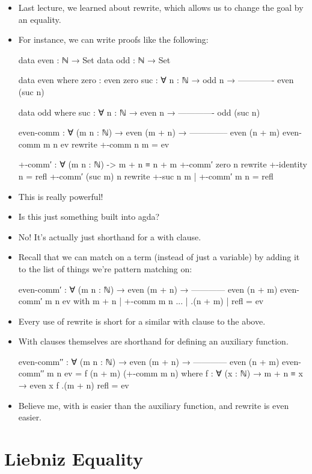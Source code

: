 \documentclass{lecturenotes}
\begin{document}
\begin{itemize}
\item Last lecture, we learned about \textsf{rewrite}, which allows us to change the goal by an equality.
\item For instance, we can write proofs like the following:
\begin{code}
data even : ℕ → Set
data odd : ℕ → Set

data even where
  zero : even zero
  suc : ∀ {n : ℕ} →
        odd n →
    -------------
    even (suc n)

data odd where
  suc : ∀ {n : ℕ} →
     even n →
  -------------
   odd (suc n)


even-comm : ∀ (m n : ℕ) →
  even (m + n) →
  --------------
  even (n + m)
even-comm m n ev rewrite +-comm n m = ev 

+-comm′ : ∀ (m n : ℕ) -> m + n ≡ n + m
+-comm′ zero n rewrite +-identity n = refl
+-comm′ (suc m) n rewrite +-suc n m | +-comm′ m n = refl    
\end{code}
\item This is really powerful! 
\item Is this just something built into agda?
\item No! It's actually just shorthand for a \textsf{with} clause.
\item Recall that we can match on a term (instead of just a variable) by adding it to the list of things we're pattern matching on:
\begin{code}
even-comm′ : ∀ (m n : ℕ) →
  even (m + n) →
  ------------
  even (n + m)
even-comm′ m n ev with   m + n  | +-comm m n
...                  | .(n + m) |       refl = ev
\end{code}
\item Every use of rewrite is short for a similar \textsf{with} clause to the above.
\item \textsf{With} clauses themselves are shorthand for defining an auxiliary function.
\begin{code}
even-comm′′ :  ∀ (m n : ℕ) →
  even (m + n) →
  ------------
  even (n + m)
even-comm′′ m n ev = f (n + m) (+-comm m n)
  where
    f : ∀ (x : ℕ) → m + n ≡ x → even x
    f .(m + n) refl = ev
\end{code}
\item Believe me, \textsf{with} is easier than the auxiliary function, and \textsf{rewrite} is even easier.
\end{itemize}

\section{Liebniz Equality}
\label{sec:liebniz-equality}
\end{document}
